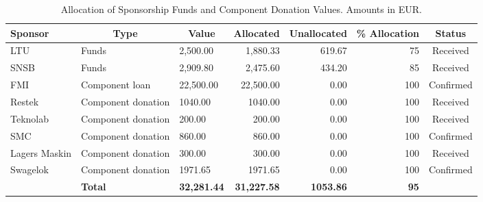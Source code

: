 \begin{table}[H]
\centering
\begin{tabular}{l|m{}|l|r|r|r|c}
\hline
\multicolumn{1}{|l|}{\textbf{Sponsor}} & \multicolumn{1}{|c|}{\textbf{Type}} & \multicolumn{1}{c|}{\textbf{Value}} & \multicolumn{1}{c|}{\textbf{Allocated}} & \multicolumn{1}{c|}{\textbf{Unallocated}} & \multicolumn{1}{c|}{\textbf{\% Allocation}} & \multicolumn{1}{c|}{\textbf{Status}} \\ \hline
\multicolumn{1}{|l|}{LTU} & Funds & 2,500.00 & 1,880.33 & 619.67 & 75 & \multicolumn{1}{c|}{Received} \\ \hline
\multicolumn{1}{|l|}{SNSB} & Funds & 2,909.80 & 2,475.60 & 434.20 & 85 & \multicolumn{1}{c|}{Received} \\ \hline
\multicolumn{1}{|l|}{FMI} & Component loan & 22,500.00 & 22,500.00 & 0.00 & 100 & \multicolumn{1}{c|}{Confirmed} \\ \hline
\multicolumn{1}{|l|}{Restek} & Component donation & 1040.00 & 1040.00 & 0.00 & 100 & \multicolumn{1}{c|}{Received} \\ \hline
\multicolumn{1}{|l|}{Teknolab} & Component donation & 200.00 & 200.00 & 0.00 & 100 & \multicolumn{1}{c|}{Received} \\ \hline
\multicolumn{1}{|l|}{SMC} & Component donation & 860.00 & 860.00 & 0.00 & 100 & \multicolumn{1}{c|}{Confirmed} \\ \hline
\multicolumn{1}{|l|}{Lagers Maskin} & Component donation & 300.00 & 300.00 & 0.00 & 100 & \multicolumn{1}{c|}{Received} \\ \hline
\multicolumn{1}{|l|}{Swagelok} & Component donation & 1971.65 & 1971.65 & 0.00 & 100 & \multicolumn{1}{c|}{Confirmed} \\ \hline
 & \multicolumn{1}{l|}{\textbf{Total}} & \textbf{32,281.44} & \textbf{31,227.58} & \textbf{1053.86} & \textbf{95} & \multicolumn{1}{l}{} \\ \cline{2-6}
\end{tabular}
\caption{Allocation of Sponsorship Funds and Component Donation Values. Amounts in EUR.}
\label{table:sponsroship-allocation}
\end{table}